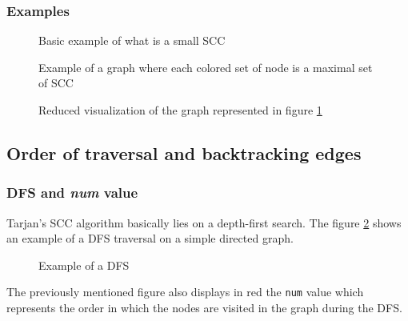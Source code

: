 \documentclass[a4 paper, 12pt]{article}
\newcommand{\edmargin}[2]{\marginpar{\raggedright\linespread{.7}\tiny #1: #2}}
\theoremstyle{definition}
\begin{document}
\subsubsection{Examples}
\begin{figure}[!h]
    \centering
    \begin{subfigure}[t]{.49\textwidth}
    \end{subfigure}
    \begin{subfigure}[t]{.49\textwidth}
    \end{subfigure}
    \caption{Basic example of what is a small SCC}
\end{figure}
\begin{figure}[!h]
    \caption{Example of a graph where each colored set of node is a maximal set of SCC\label{fig:exampleSCC}}
\end{figure}

\begin{figure}[!h]
    \caption{Reduced visualization of the graph represented in figure \ref{fig:exampleSCC}}
\end{figure}

\subsection{Order of traversal and backtracking edges}
\subsubsection{DFS and \textit{num} value}
Tarjan's SCC algorithm\edmargin{sm}{not mentioned yet} basically lies on a depth-first search. The figure \ref{fig:dfs} shows an example of a DFS traversal on a simple directed graph.
\begin{figure}[!h]
    \caption{Example of a DFS\label{fig:dfs}}
\end{figure}

The previously mentioned figure also displays in red the \texttt{num} value which represents the order in which the nodes are visited in the graph during the DFS.
\end{document}
